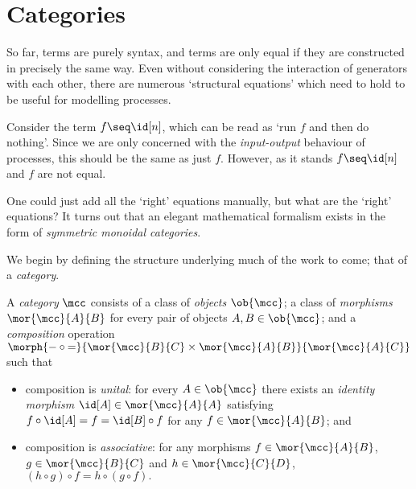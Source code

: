 \section{Categories}

So far, terms are purely syntax, and terms are only equal if they are
constructed in precisely the same way.
Even without considering the interaction of generators with each other, there
are numerous `structural equations' which need to hold to be useful for
modelling processes.

\begin{example}
    Consider the term \(f \seq \id[n]\), which can be read as `run \(f\) and
    then do nothing'.
    Since we are only concerned with the \emph{input-output} behaviour of
    processes, this should be the same as just \(f\).
    However, as it stands \(f \seq \id[n]\) and \(f\) are not equal.
\end{example}

One could just add all the `right' equations manually, but what are the `right'
equations?
It turns out that an elegant mathematical formalism exists in the form of
\emph{symmetric monoidal categories}.

We begin by defining the structure underlying much of the work to come; that of
a \emph{category}.

\begin{definition}[Categories]
    \label{def:category}
    A \emph{category} \(\mcc\) consists of a class of \emph{objects}
    \(\ob{\mcc}\); a class of \emph{morphisms} \(\mor{\mcc}{A}{B}\)
    for every pair of objects \(A, B \in \ob{\mcc}\); and a \emph{composition}
    operation \(
        \morph{
            {-} \circ {=}
        }{
            \mor{\mcc}{B}{C} \times \mor{\mcc}{A}{B}
        }{
            \mor{\mcc}{A}{C}
        }
    \) such that
    \begin{itemize}
        \item composition is \emph{unital}: for every \(
                    A \in \ob{\mcc}
                \) there exists an \emph{identity morphism} \(
                    \id[A] \in \mor{\mcc}{A}{A}
                \) satisfying \(
                    f \circ \id[A] = f = \id[B] \circ f
                \) for any \(
                    f \in \mor{\mcc}{A}{B}
                \); and
        \item composition is \emph{associative}: for any morphisms \(
                    f \in \mor{\mcc}{A}{B}
                \), \(
                    g \in \mor{\mcc}{B}{C}
                \) and \(h \in \mor{\mcc}{C}{D}\), \(
                    (h \circ g) \circ f = h \circ (g \circ f).
                \)
    \end{itemize}
\end{definition}

